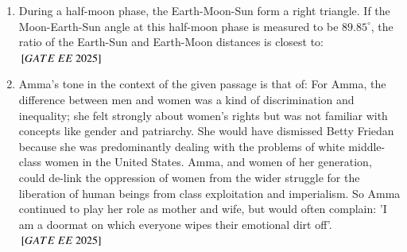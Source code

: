 \documentclass[journal,12pt,onecolumn]{IEEEtran}
\theoremstyle{remark}
\begin{document}
\begin{enumerate}
   \item During a half-moon phase, the Earth-Moon-Sun form a right triangle. If the Moon-Earth-Sun angle at this half-moon phase is measured to be $89.85^\circ$, the ratio of the Earth-Sun and Earth-Moon distances is closest to: \\    
\hfill ${}\left[GATE\ EE\ 2025\right]$
    \begin{enumerate}
    \end{enumerate}

 \item Amma's tone in the context of the given passage is that of: \newline
  For Amma, the difference between men and women was a kind of discrimination and inequality; she felt strongly about women's rights but was not familiar with concepts like gender and patriarchy. She would have dismissed Betty Friedan because she was predominantly dealing with the problems of white middle-class women in the United States. Amma, and women of her generation, could de-link the oppression of women from the wider struggle for the liberation of human beings from class exploitation and imperialism. So Amma continued to play her role as mother and wife, but would often complain: 'I am a doormat on which everyone wipes their emotional dirt off'.
\hfill ${}\left[GATE\ EE\ 2025\right]$ 
    \begin{enumerate}
    \end{enumerate}


\end{enumerate}
\end{document}
